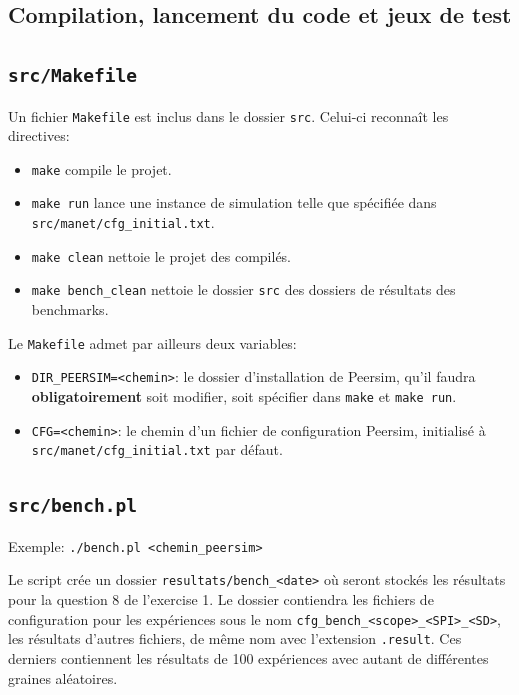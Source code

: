 \documentclass[a4paper]{article}
\begin{document}
\begin{appendix}
  \section{Compilation, lancement du code et jeux de test}
  \subsection{\texttt{src/Makefile}}
    Un fichier \texttt{Makefile} est inclus dans le dossier
    \texttt{src}. Celui-ci reconnaît les directives:
    \begin{itemize}
    \item \texttt{make} compile le projet.
    \item \texttt{make run} lance une instance de simulation telle que
      spécifiée dans \texttt{src/manet/cfg\_initial.txt}.
    \item \texttt{make clean} nettoie le projet des compilés.
    \item \texttt{make bench\_clean} nettoie le dossier \texttt{src}
      des dossiers de résultats des benchmarks.\\
    \end{itemize}

    Le \texttt{Makefile} admet par ailleurs deux variables:
    \begin{itemize}
    \item \texttt{DIR\_PEERSIM=<chemin>}: le dossier d'installation de
      Peersim, qu'il faudra \textbf{obligatoirement} soit modifier,
      soit spécifier dans \texttt{make} et \texttt{make run}.
    \item \texttt{CFG=<chemin>}: le chemin d'un fichier de
      configuration Peersim, initialisé à \texttt{src/manet/cfg\_initial.txt} par défaut.
    \end{itemize}

    \subsection{\texttt{src/bench.pl}}
    Exemple: \texttt{./bench.pl <chemin\_peersim>}

    Le script crée un dossier \texttt{resultats/bench\_<date>} où seront stockés les
    résultats pour la question 8 de l'exercise 1. Le dossier contiendra
    les fichiers de configuration pour les expériences sous le nom
    \texttt{cfg\_bench\_<scope>\_<SPI>\_<SD>}, les résultats d'autres
    fichiers, de même nom avec l'extension \texttt{.result}. Ces derniers contiennent les résultats de 100 expériences avec autant de différentes graines aléatoires.


\end{appendix}
\end{document}
